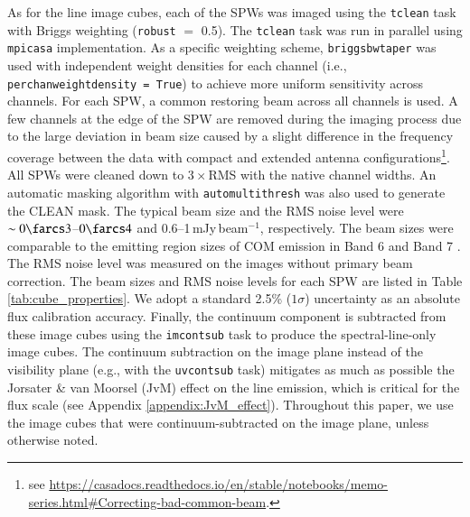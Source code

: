 \documentclass[linenumbers, twocolumn, twocolappendix, astrosymb, times]{aastex631}
\begin{document}
As for the line image cubes, each of the SPWs was imaged using the \texttt{tclean} task \citep{Hogbom1974} with Briggs weighting (\texttt{robust} $=$ 0.5). The \texttt{tclean} task was run in parallel using \texttt{mpicasa} implementation. As a specific weighting scheme, \texttt{briggsbwtaper} was used with independent weight densities for each channel (i.e., \texttt{perchanweightdensity = True}) to achieve more uniform sensitivity across channels. For each SPW, a common restoring beam across all channels is used. A few channels at the edge of the SPW are removed during the imaging process due to the large deviation in beam size caused by a slight difference in the frequency coverage between the data with compact and extended antenna configurations\footnote{see \url{https://casadocs.readthedocs.io/en/stable/notebooks/memo-series.html\#Correcting-bad-common-beam}.}. All SPWs were cleaned down to 3\,$\times$\,RMS with the native channel widths. An automatic masking algorithm with \texttt{automultithresh} was also used to generate the CLEAN mask. The typical beam size and the RMS noise level were $\sim0\farcs3$--$0\farcs4$ and 0.6--1\,mJy\,beam$^{-1}$, respectively. \textrm{The beam sizes were comparable to the emitting region sizes of COM emission in Band 6 and Band 7 \citep{Lee2019, Tobin2023}.} The RMS noise level was measured on the images without primary beam correction. The beam sizes and RMS noise levels for each SPW are listed in Table \ref{tab:cube_properties}. \textrm{We adopt a standard 2.5\% ($1\sigma$) uncertainty as an absolute flux calibration accuracy.}  Finally, the continuum component is subtracted from these image cubes using the \texttt{imcontsub} task to produce the spectral-line-only image cubes. The continuum subtraction on the image plane instead of the visibility plane (e.g., with the \texttt{uvcontsub} task) mitigates as much as possible the Jorsater \& van Moorsel (JvM) effect \citep{JvM, Czekala2021} on the line emission, which is critical for the flux scale (see Appendix \ref{appendix:JvM_effect}). Throughout this paper, we use the image cubes that were continuum-subtracted on the image plane, unless otherwise noted.

\textrm{}
\end{document}
